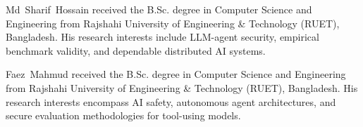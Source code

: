 \documentclass[journal]{IEEEtran}
\begin{document}





\begin{IEEEbiographynophoto}{Md~Sharif~Hossain}
received the B.Sc. degree in Computer Science and Engineering from Rajshahi University of Engineering \& Technology (RUET), Bangladesh. His research interests include LLM-agent security, empirical benchmark validity, and dependable distributed AI systems.
\end{IEEEbiographynophoto}

\begin{IEEEbiographynophoto}{Faez~Mahmud}
received the B.Sc. degree in Computer Science and Engineering from Rajshahi University of Engineering \& Technology (RUET), Bangladesh. His research interests encompass AI safety, autonomous agent architectures, and secure evaluation methodologies for tool-using models.
\end{IEEEbiographynophoto}
\end{document}
